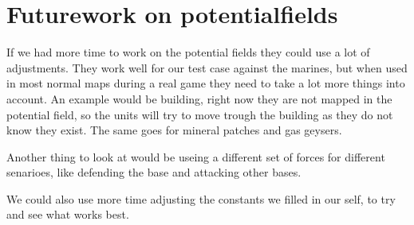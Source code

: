 \section{Futurework on potentialfields}
	If we had more time to work on the potential fields they could use a lot of adjustments. They work well for our test case against the marines, but when used in most normal maps during a real game they need to take a lot more things into account. An example would be building, right now they are not mapped in the potential field, so the units will try to move trough the building as they do not know they exist. The same goes for mineral patches and gas geysers. 
	
	Another thing to look at would be useing a different set of forces for different senarioes, like defending the base and attacking other bases.
	
	We could also use more time adjusting the constants we filled in our self, to try and see what works best.
	
